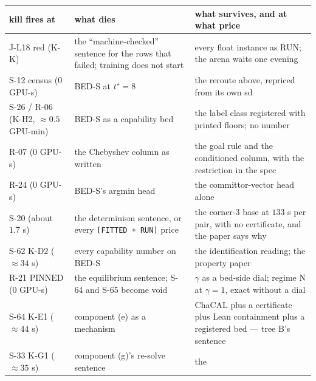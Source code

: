 \documentclass[11pt,a4paper]{article}
\newcounter{none}                 %
\theoremstyle{plain}
\theoremstyle{definition}
\theoremstyle{remark}
\begin{document}
{\def\LTcaptype{none} %
\begin{longtable}[]{@{}
  >{\raggedright\arraybackslash}p{}
  >{\raggedright\arraybackslash}p{}
  >{\raggedright\arraybackslash}p{}@{}}
\toprule\noalign{}
\begin{minipage}[b]{\linewidth}\raggedright
kill fires at
\end{minipage} & \begin{minipage}[b]{\linewidth}\raggedright
what dies
\end{minipage} & \begin{minipage}[b]{\linewidth}\raggedright
what survives, and at what price
\end{minipage} \\
\midrule\noalign{}
\endhead
\bottomrule\noalign{}
\endlastfoot
J-L18 red (K-K) & the ``machine-checked'' sentence for the rows that
failed; training does not start & every float instance as RUN; the arena
waits one evening \\
S-12 census (\(0\) GPU-s) & BED-S at \(t^\star=8\) & the reroute above,
repriced from its own sd \\
S-26 / R-06 (K-H2, \(\approx0.5\) GPU-min) & BED-S as a capability bed &
the label class registered with printed floors; no number \\
R-07 (\(0\) GPU-s) & the Chebyshev column as written & the goal rule and
the conditioned column, with the restriction in the spec \\
R-24 (\(0\) GPU-s) & BED-S's argmin head & the committor-vector head
alone \\
S-20 (about \(1.7\) s) & the determinism sentence, or every
\texttt{{[}FITTED\ +\ RUN{]}} price & the corner-3 base at \(133\) s per
pair, with no certificate, and the paper says why \\
S-62 K-D2 (\(\approx34\) s) & every capability number on BED-S & the
identification reading; the property paper \\
R-21 PINNED (\(0\) GPU-s) & the equilibrium sentence; S-64 and S-65
become void & \(\gamma\) as a bed-side dial; regime N at \(\gamma=1\),
exact without a dial \\
S-64 K-E1 (\(\approx44\) s) & component (e) as a mechanism & ChaCAL plus
a certificate plus Lean containment plus a registered bed --- tree B's
sentence \\
S-33 K-G1 (\(\approx35\) s) & component (g)'s re-solve sentence & the

\end{longtable}}
\end{document}
